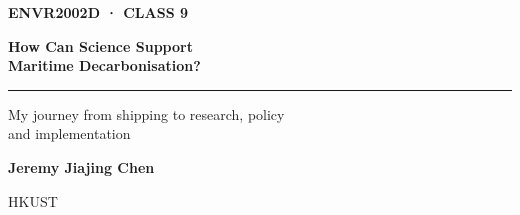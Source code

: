 \documentclass[aspectratio=169,11pt]{beamer}
\newcommand{\eyebrow}[1]{%
  {\color{Orange}\fontsize{9}{11}\selectfont\bfseries\MakeUppercase{#1}\par}
}
\begin{document}
\begin{frame}[plain]
  \vspace{0.75cm}
  \eyebrow{ENVR2002D · Class 9}

  \vspace{0.62cm}
  {\color{Navy}\fontsize{29}{32}\selectfont\bfseries
    How Can Science Support\\
    Maritime Decarbonisation?
  \par}

  \vspace{0.45cm}
  {\color{Orange}\rule{2.1cm}{1.4pt}\par}

  \vspace{0.42cm}
  {\color{Muted}\fontsize{15}{20}\selectfont
    My journey from shipping to research, policy\\
    and implementation
  \par}

  \vfill
  {\color{Navy}\fontsize{12}{15}\selectfont\bfseries Jeremy Jiajing Chen\par}
  \vspace{0.08cm}
  {\color{Muted}\fontsize{10}{13}\selectfont HKUST\par}
  \vspace{0.45cm}
\end{frame}
\end{document}

